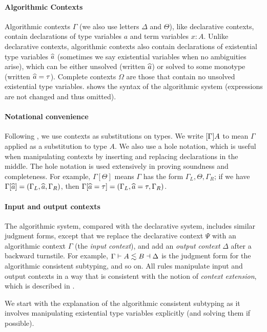\paragraph{Algorithmic Contexts}

Algorithmic contexts $\Gamma$ (we also use letters $\Delta$ and $\Theta$), like
declarative contexts, contain declarations of type variables $a$ and term
variables $x : A$. Unlike declarative contexts, algorithmic contexts also
contain declarations of existential type variables $\widehat{a}$ (sometimes we say
existential variables when no ambiguities arise), which can be either unsolved
(written $\widehat{a}$) or solved to some monotype (written $\widehat{a} = \tau$). Complete
contexts $\Omega$ are those that contain no unsolved existential type variables.
 shows the syntax of the algorithmic system
(expressions are not changed and thus omitted).


\paragraph{Notational convenience}
Following \citet{dunfield2013complete}, we use contexts as substitutions on
types. We write $[\Gamma]A$ to mean $\Gamma$ applied as a
substitution to type $A$. We also use a hole notation, which is useful when
manipulating contexts by inserting and replacing declarations in the middle. The
hole notation is used extensively in proving soundness and completeness. For
example, $\Gamma[\Theta]$ means $\Gamma$ has the form $\Gamma_L, \Theta,
\Gamma_R$; if we have $\Gamma[\widehat{a}] = (\Gamma_L, \widehat{a}, \Gamma_R)$, then
$\Gamma[\widehat{a} = \tau] = (\Gamma_L, \widehat{a} = \tau, \Gamma_R)$.

\paragraph{Input and output contexts}
The algorithmic system, compared with the declarative system, includes similar
judgment forms, except that we replace the declarative context $\Psi$ with an
algorithmic context $\Gamma$ (the \textit{input context}), and add an
\textit{output context} $\Delta$ after a backward turnstile. For example,
$\Gamma \vdash A \lesssim B \dashv \Delta$ is the judgment form for the
algorithmic consistent subtyping, and so on. All rules manipulate input and
output contexts in a way that is consistent with the notion of \textit{context
  extension}, which is described in .

We start with the explanation of the algorithmic consistent subtyping as it
involves manipulating existential type variables explicitly (and solving them if
possible).

